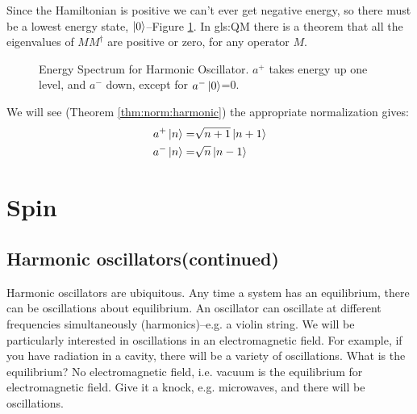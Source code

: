 \documentclass[]{article}
\begin{document}
 Since the Hamiltonian is positive we can't ever get negative energy, so there must be a lowest energy state, $\ket{0}$--Figure \ref{fig:aqm-3-spectrum}. In \gls{gls:QM} there is a theorem that all the eigenvalues of $MM^\dagger$ are positive or zero, for any operator $M$. 

\begin{figure}[H]
	\begin{center}
		\caption[Energy Spectrum for Harmonic Oscillator]{Energy Spectrum for Harmonic Oscillator. $a^+$ takes energy up one level, and $a^-$ down, except for $a^-\ket{0}$=0.}\label{fig:aqm-3-spectrum}
	\end{center}
\end{figure}

We will see (Theorem \ref{thm:norm:harmonic}) the appropriate normalization gives:
\begin{align*}
	a^+\ket{n} =& \sqrt{n+1}\ket{n+1}\\
	a^-\ket{n} =& \sqrt{n}\ket{n-1}
\end{align*}
 
\section{Spin}

\subsection{Harmonic oscillators(continued)}

Harmonic oscillators are ubiquitous. Any time a system has an equilibrium, there can be oscillations about equilibrium. An oscillator can oscillate at different frequencies simultaneously (harmonics)--e.g. a violin string. We will be particularly interested in oscillations in an electromagnetic field.  For example, if you have radiation in a cavity, there will be a variety of oscillations. What is the equilibrium? No electromagnetic field, i.e. vacuum is the equilibrium for electromagnetic field. Give it a knock, e.g. microwaves, and there will be oscillations.
\end{document}
